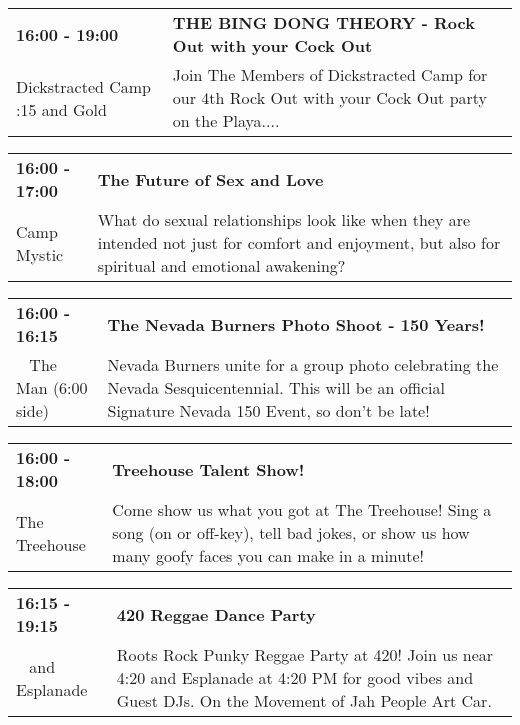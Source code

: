 \begin{tabular}{ p{1in} p{2.2in} }
    \textbf{16:00 - 19:00} & \textbf{THE BING DONG THEORY - Rock Out with your Cock Out} \\
    Dickstracted Camp \newline 7:15 and Gold & Join The Members of Dickstracted Camp for our 4th Rock Out with your Cock Out party on the Playa.... \\
    \hline 
\end{tabular}
    
\begin{tabular}{ p{1in} p{2.2in} }
    \textbf{16:00 - 17:00} & \textbf{The Future of Sex and Love} \\
    Camp Mystic \newline  & What do sexual relationships look like when they are intended not just for comfort and enjoyment, but also for spiritual and emotional awakening? \\
    \hline 
\end{tabular}
    
\begin{tabular}{ p{1in} p{2.2in} }
    \textbf{16:00 - 16:15} & \textbf{The Nevada Burners Photo Shoot - 150 Years!} \\
    ~ \newline The Man (6:00 side) & Nevada Burners unite for a group photo celebrating the Nevada Sesquicentennial. This will be an official Signature Nevada 150 Event, so don't be late! \\
    \hline 
\end{tabular}
    
\begin{tabular}{ p{1in} p{2.2in} }
    \textbf{16:00 - 18:00} & \textbf{Treehouse Talent Show!} \\
    The Treehouse \newline  & Come show us what you got at The Treehouse! Sing a song (on or off-key), tell bad jokes, or show us how many goofy faces you can make in a minute! \\
    \hline 
\end{tabular}
    
\begin{tabular}{ p{1in} p{2.2in} }
    \textbf{16:15 - 19:15} & \textbf{420 Reggae Dance Party} \\
    ~ \newline 420 and Esplanade  & Roots Rock Punky Reggae Party at 420! Join us near 4:20 and Esplanade at 4:20 PM for good vibes and Guest DJs. On the Movement of Jah People Art Car. \\
    \hline 
\end{tabular}
    
